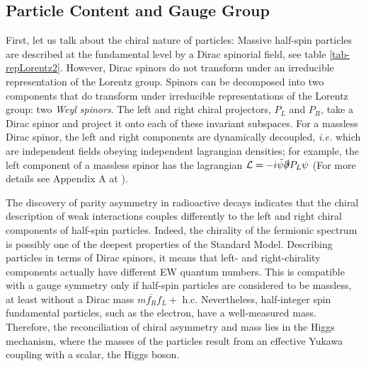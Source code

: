 \subsection{Particle Content and Gauge Group}

First, let us talk about the chiral nature of particles: Massive half-spin particles are described at the fundamental level by a Dirac spinorial field, see table \ref{tab-repLorentz2}. However, Dirac spinors do not transform under an irreducible representation of the Lorentz group. Spinors can be decomposed into two components that do transform under irreducible representations of the Lorentz group: two \textit{Weyl spinors}. The left and right chiral projectors, $P_L$ and $P_R$, take a Dirac spinor and project it onto each of these invariant subspaces. For a massless Dirac spinor, the left and right components are dynamically decoupled, \textit{i.e.} which are independent fields obeying independent lagrangian densities; for example, the left component of a massless spinor has the lagrangian $\mathcal{L}=-i\bar\psi\slashed{\partial}P_L\psi$ (For more details see Appendix A at \cite{CRodriguezUPTC}). 

The discovery of parity asymmetry in radioactive decays \cite{PhysRev.105.1413} indicates that the chiral description of weak interactions couples differently to the left and right chiral components of half-spin particles. Indeed, the chirality of the fermionic spectrum is possibly one of the deepest properties of the Standard Model. Describing particles in terms of Dirac spinors, it means that left- and right-chirality components actually have different EW quantum numbers. This is compatible with a gauge symmetry only if half-spin particles are considered to be massless, at least without a Dirac mass $m \overline{f_{R}} f_{L}+\text { h.c.}$ Nevertheless, half-integer spin fundamental particles, such as the electron, have a well-measured mass. Therefore, the reconciliation of chiral asymmetry and mass lies in the Higgs mechanism, where the masses of the particles result from an effective Yukawa coupling with a scalar, the Higgs boson.

